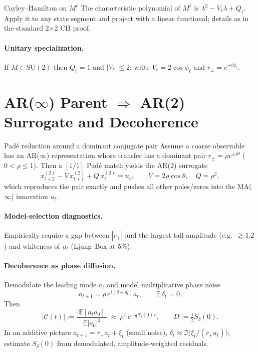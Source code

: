 \documentclass[11pt]{article}
\newcommand{\M}{M}
\newcommand{\Vl}{V_\ell}
\newcommand{\Qell}{Q^\ell}
\renewcommand{\Qell}{Q_\ell}
\begin{document}
\begin{proofbox}{Cayley--Hamilton on $M^\ell$}
The characteristic polynomial of $\M^\ell$ is $\lambda^2-\Vl\lambda+\Qell$.
Apply it to any state segment and project with a linear functional; details as in the standard 2$\times$2 CH proof.
\end{proofbox}

\paragraph{Unitary specialization.}
If $\M\in\mathrm{SU}(2)$ then $Q_\ell=1$ and $|V_\ell|\le2$; write $V_\ell=2\cos\phi_\ell$ and $r_\pm=e^{\pm i\phi_\ell}$.

\section{AR($\infty$) Parent $\Rightarrow$ AR(2) Surrogate and Decoherence}
\begin{myprop}{Pad\'e reduction around a dominant conjugate pair}
Assume a coarse observable has an AR($\infty$) representation whose transfer has a dominant pair $r_\pm=\rho e^{\pm i\theta}$ ($0<\rho\le 1$).
Then a $[1/1]$ Pad\'e match yields the AR(2) surrogate
\begin{equation}
x^{(2)}_{t+2}-V\,x^{(2)}_{t+1}+Q\,x^{(2)}_{t}=u_t,\qquad
V=2\rho\cos\theta,\quad Q=\rho^2,
\label{eq:ar2sur}
\end{equation}
which reproduces the pair exactly and pushes all other poles/zeros into the MA($\infty$) innovation $u_t$.
\end{myprop}

\paragraph{Model-selection diagnostics.}
Empirically require a gap between $|r_+|$ and the largest tail amplitude (e.g.\ $\gtrsim1.2$) and whiteness of $u_t$ (Ljung--Box at 5\%).

\paragraph{Decoherence as phase diffusion.}
Demodulate the leading mode $a_t$ and model multiplicative phase noise
\begin{equation}
a_{t+1}=\rho\,e^{i(\theta+\delta_t)}a_t,\qquad \mathbb E\,\delta_t=0.
\end{equation}
Then
\begin{equation}
|\mathcal C(t)|:=\frac{|\mathbb E[a_t\overline{a_0}]|}{\mathbb E|a_0|^2}\ \approx\ \rho^{\,t}\,e^{-\frac12 S_\delta(0)\,t},
\qquad D:=\tfrac12 S_\delta(0).
\end{equation}
In an additive picture $a_{t+1}=r_+ a_t+\xi_t$ (small noise), $\delta_t\approx\Im\!\big(\xi_t/(r_+a_t)\big)$; estimate $S_\delta(0)$ from demodulated, amplitude-weighted residuals.
\end{document}
